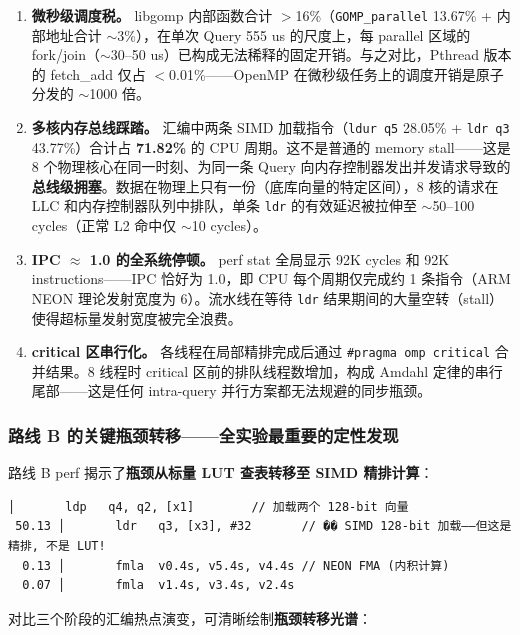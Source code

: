 \documentclass[UTF8,a4paper,10pt]{ctexart}
\begin{document}
\begin{enumerate}
\item \textbf{微秒级调度税。} libgomp 内部函数合计 $>$16\%（\texttt{GOMP\_parallel} 13.67\% + 内部地址合计 $\sim$3\%），在单次 Query 555 us 的尺度上，每 parallel 区域的 fork/join（$\sim$30--50 us）已构成无法稀释的固定开销。与之对比，Pthread 版本的 fetch\_add 仅占 $<$0.01\%——OpenMP 在微秒级任务上的调度开销是原子分发的 $\sim$1000 倍。

\item \textbf{多核内存总线踩踏。} 汇编中两条 SIMD 加载指令（\texttt{ldur q5} 28.05\% + \texttt{ldr q3} 43.77\%）合计占 \textbf{71.82\%} 的 CPU 周期。这不是普通的 memory stall——这是 8 个物理核心在同一时刻、为同一条 Query 向内存控制器发出并发请求导致的\textbf{总线级拥塞}。数据在物理上只有一份（底库向量的特定区间），8 核的请求在 LLC 和内存控制器队列中排队，单条 \texttt{ldr} 的有效延迟被拉伸至 $\sim$50--100 cycles（正常 L2 命中仅 $\sim$10 cycles）。

\item \textbf{IPC $\approx$ 1.0 的全系统停顿。} perf stat 全局显示 92K cycles 和 92K instructions——IPC 恰好为 1.0，即 CPU 每个周期仅完成约 1 条指令（ARM NEON 理论发射宽度为 6）。流水线在等待 \texttt{ldr} 结果期间的大量空转（stall）使得超标量发射宽度被完全浪费。

\item \textbf{critical 区串行化。} 各线程在局部精排完成后通过 \texttt{\#pragma omp critical} 合并结果。8 线程时 critical 区前的排队线程数增加，构成 Amdahl 定律的串行尾部——这是任何 intra-query 并行方案都无法规避的同步瓶颈。
\end{enumerate}

\subsubsection{路线 B 的关键瓶颈转移——全实验最重要的定性发现}

路线 B perf 揭示了\textbf{瓶颈从标量 LUT 查表转移至 SIMD 精排计算}：

\begin{lstlisting}[language={[x86masm]Assembler}, caption={路线 B 热点汇编：瓶颈已从标量 LDR 转向 SIMD 宽加载}]
       │       ldp   q4, q2, [x1]        // 加载两个 128-bit 向量
 50.13 │       ldr   q3, [x3], #32       // �� SIMD 128-bit 加载——但这是精排, 不是 LUT!
  0.13 │       fmla  v0.4s, v5.4s, v4.4s // NEON FMA (内积计算)
  0.07 │       fmla  v1.4s, v3.4s, v2.4s
\end{lstlisting}

对比三个阶段的汇编热点演变，可清晰绘制\textbf{瓶颈转移光谱}：
\end{document}
